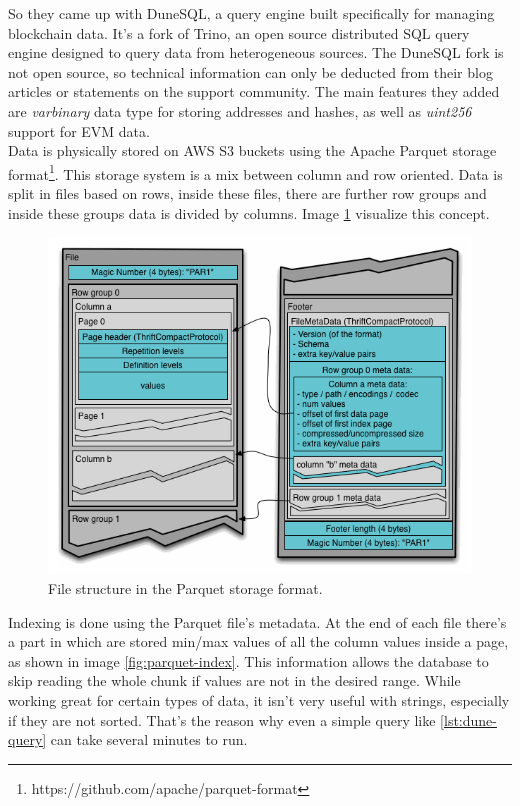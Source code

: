 So they came up with DuneSQL, a query engine built specifically for managing blockchain data. It's a fork of Trino, an open source distributed SQL query engine designed to query data from heterogeneous sources. The DuneSQL fork is not open source, so technical information can only be deducted from their blog articles or statements on the support community. The main features they added are \textit{varbinary} data type for storing addresses and hashes, as well as \textit{uint256} support for EVM data. \\

Data is physically stored on AWS S3 buckets using the Apache Parquet storage format\footnote{https://github.com/apache/parquet-format}. This storage system is a mix between column and row oriented. Data is split in files based on rows, inside these files, there are further row groups and inside these groups data is divided by columns. Image \ref{fig:parquet-structure} visualize this concept. \\

\begin{figure}[H]
  \centering
  \includegraphics[width=1\textwidth]{Figures/parquet-structure.png}
  \caption[Parquet storage format structure]{File structure in the Parquet storage format\protect\footnotemark.}
  \label{fig:parquet-structure}
\end{figure}


Indexing is done using the Parquet file's metadata. At the end of each file there's a part in which are stored min/max values of all the column values inside a page, as shown in image \ref{fig:parquet-index}. This information allows the database to skip reading the whole chunk if values are not in the desired range. While working great for certain types of data, it isn't very useful with strings, especially if they are not sorted. That's the reason why even a simple query like \ref{lst:dune-query} can take several minutes to run. \\

